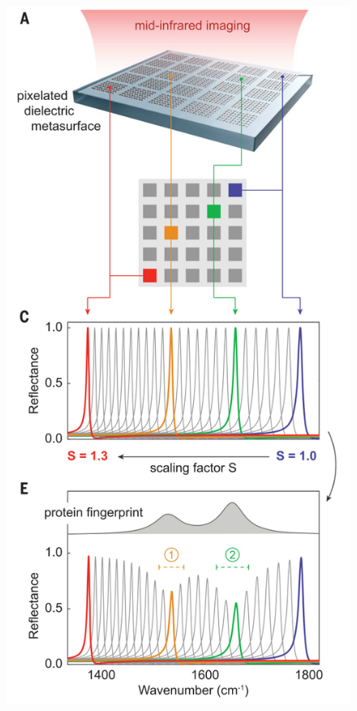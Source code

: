 \begin{frame}[c]
\begin{columns}
\begin{column}{.3\textwidth}
\begin{figure}[H]
                \includegraphics[width=.9\textwidth]{figures/Imaging-based molecular barcoding with pixelated dielectric metasurfaces_1.png} %
            \end{figure}
        \end{column}
    \end{columns}
    \begin{figure}[H] %

\end{figure}
\end{frame}
